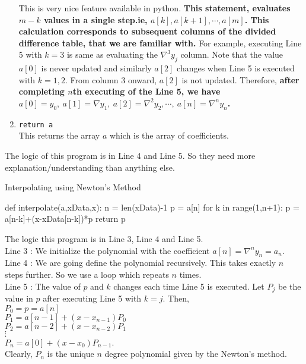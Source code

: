 \begin{commentary}
\begin{enumerate}[label=Line \arabic*]
		This is very nice feature available in python. \textbf{This statement, evaluates $m-k$ values in a single step.ie, $a[k],a[k+1],\cdots,a[m]$. This calculation corresponds to subsequent columns of the divided difference table, that we are familiar with.} For example, executing Line 5 with $k=3$ is same as evaluating the $\nabla^3y_j$ column. Note that the value $a[0]$ is never updated and similarly $a[2]$ changes when Line 5 is executed with $k=1,2$. From column 3 onward, $a[2]$ is not updated. Therefore, \textbf{after completing $n$th executing of the Line 5, we have $a[0] = y_0,\ a[1]=\nabla y_1,\ a[2]=\nabla^2 y_2,\cdots,\ a[n]=\nabla^n y_n$.}
	\item \texttt{return a}\\
		This returns the array $a$ which is the array of coefficients.
\end{enumerate}
	The logic of this program is in Line 4 and Line 5. So they need more explanation/understanding than anything else.
\end{commentary}

\begin{program}Interpolating using Newton's Method
	\begin{python}
		def interpolate(a,xData,x):
			n = len(xData)-1
			p = a[n]
			for k in range(1,n+1):
				p = a[n-k]+(x-xData[n-k])*p
			return p
	\end{python}
	The logic this program is in Line 3, Line 4 and Line 5.\\

	Line 3 : We initialize the polynomial with the coefficient $a[n] = \nabla^n y_n = a_n$.\\

	Line 4 : We are going define the polynomial recursively. This takes exactly $n$ steps further. So we use a loop which repeats $n$ times.\\

	Line 5 : The value of $p$ and $k$ changes each time Line 5 is executed. Let $P_j$ be the value in $p$ after executing Line 5 with $k=j$. Then,\\ $P_0 = p = a[n]$\\ $P_1 = a[n-1]+(x-x_{n-1})P_0$\\ $P_2 = a[n-2]+(x-x_{n-2})P_1$\\ $\vdots$\\ $P_n = a[0]+(x-x_0)P_{n-1}$.\\ Clearly, $P_n$ is the unique $n$ degree polynomial given by the Newton's method.
\end{program}

